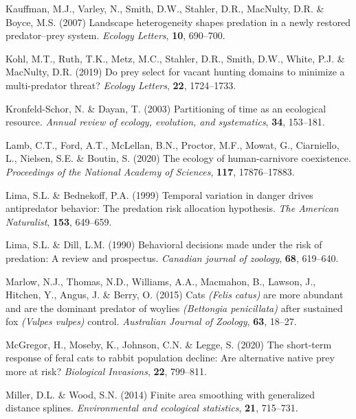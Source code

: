 \documentclass[]{elsarticle} %
\begin{document}
\leavevmode\hypertarget{ref-kauffman2007landscape}{}%
Kauffman, M.J., Varley, N., Smith, D.W., Stahler, D.R., MacNulty, D.R. \& Boyce, M.S. (2007) Landscape heterogeneity shapes predation in a newly restored predator--prey system. \emph{Ecology Letters}, \textbf{10}, 690--700.

\leavevmode\hypertarget{ref-kohl2019prey}{}%
Kohl, M.T., Ruth, T.K., Metz, M.C., Stahler, D.R., Smith, D.W., White, P.J. \& MacNulty, D.R. (2019) Do prey select for vacant hunting domains to minimize a multi-predator threat? \emph{Ecology Letters}, \textbf{22}, 1724--1733.

\leavevmode\hypertarget{ref-kronfeld2003partitioning}{}%
Kronfeld-Schor, N. \& Dayan, T. (2003) Partitioning of time as an ecological resource. \emph{Annual review of ecology, evolution, and systematics}, \textbf{34}, 153--181.

\leavevmode\hypertarget{ref-lamb2020ecology}{}%
Lamb, C.T., Ford, A.T., McLellan, B.N., Proctor, M.F., Mowat, G., Ciarniello, L., Nielsen, S.E. \& Boutin, S. (2020) The ecology of human-carnivore coexistence. \emph{Proceedings of the National Academy of Sciences}, \textbf{117}, 17876--17883.

\leavevmode\hypertarget{ref-lima1999temporal}{}%
Lima, S.L. \& Bednekoff, P.A. (1999) Temporal variation in danger drives antipredator behavior: The predation risk allocation hypothesis. \emph{The American Naturalist}, \textbf{153}, 649--659.

\leavevmode\hypertarget{ref-lima1990behavioral}{}%
Lima, S.L. \& Dill, L.M. (1990) Behavioral decisions made under the risk of predation: A review and prospectus. \emph{Canadian journal of zoology}, \textbf{68}, 619--640.

\leavevmode\hypertarget{ref-marlow2015cats}{}%
Marlow, N.J., Thomas, N.D., Williams, A.A., Macmahon, B., Lawson, J., Hitchen, Y., Angus, J. \& Berry, O. (2015) Cats \emph{(Felis catus)} are more abundant and are the dominant predator of woylies \emph{(Bettongia penicillata)} after sustained fox \emph{(Vulpes vulpes)} control. \emph{Australian Journal of Zoology}, \textbf{63}, 18--27.

\leavevmode\hypertarget{ref-mcgregor2020short}{}%
McGregor, H., Moseby, K., Johnson, C.N. \& Legge, S. (2020) The short-term response of feral cats to rabbit population decline: Are alternative native prey more at risk? \emph{Biological Invasions}, \textbf{22}, 799--811.

\leavevmode\hypertarget{ref-miller2014finite}{}%
Miller, D.L. \& Wood, S.N. (2014) Finite area smoothing with generalized distance splines. \emph{Environmental and ecological statistics}, \textbf{21}, 715--731.
\end{document}
